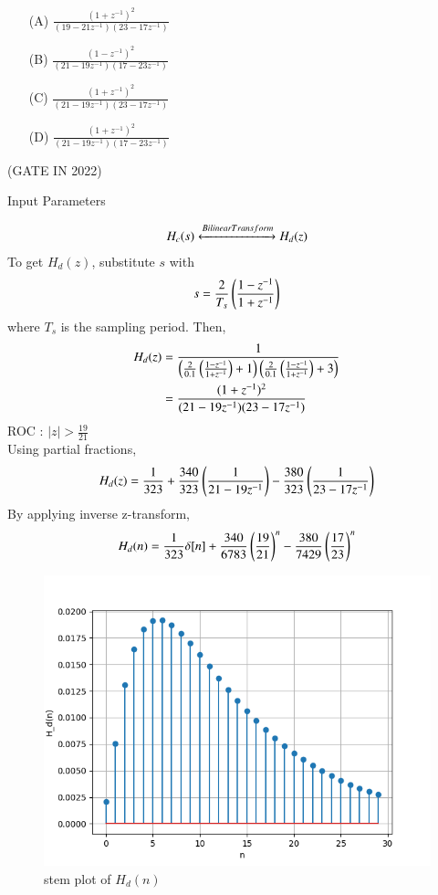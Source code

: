 \documentclass[journal,12pt,twocolumn]{IEEEtran}
\theoremstyle{remark}
\begin{document}
\begin{enumerate}
\item[(A)] $\frac{(1+z^{-1})^2}{(19-21z^{-1})(23-17z^{-1})}$\\
\item[(B)] $\frac{(1-z^{-1})^2}{(21-19z^{-1})(17-23z^{-1})}$\\
\item[(C)] $\frac{(1+z^{-1})^2}{(21-19z^{-1})(23-17z^{-1})}$\\
\item[(D)] $\frac{(1+z^{-1})^2}{(21-19z^{-1})(17-23z^{-1})}$
\end{enumerate}
\hfill{(GATE IN 2022)}\\
\solution
\begin{table}[h!]
\centering

\caption{Input Parameters}
\label{tab:gate2022in38table}
\end{table}
\begin{align}
H_c(s) \xleftrightarrow{Bilinear Transform} H_d(z)
\end{align}
To get $H_d(z)$, substitute $s$ with
\begin{align}
s = \frac{2}{T_s}\left(\frac{1-z^{-1}}{1+z^{-1}}\right)
\end{align}
where $T_s$ is the sampling period. Then,
\begin{align}
H_d(z) &= \frac{1}{\left(\frac{2}{0.1}\left(\frac{1-z^{-1}}{1+z^{-1}}\right)+1\right){\left(\frac{2}{0.1}\left(\frac{1-z^{-1}}{1+z^{-1}}\right)+3\right)}}\\
&= \frac{(1+z^{-1})^2}{(21-19z^{-1})(23-17z^{-1})}
\end{align}
ROC : $|z| > \frac{19}{21}$\\
Using partial fractions,
\begin{align}
H_d(z) = \frac{1}{323} + \frac{340}{323}\left(\frac{1}{21-19z^{-1}}\right) - \frac{380}{323}\left(\frac{1}{23-17z^{-1}}\right)
\end{align}
By applying inverse z-transform,
\begin{align}
H_d(n) = \frac{1}{323}\delta[n] + \frac{340}{6783}\left(\frac{19}{21}\right)^{n} - \frac{380}{7429}\left(\frac{17}{23}\right)^{n}
\end{align}
\begin{figure}[h!]
    \centering
    \includegraphics[width=0.8\columnwidth]{figs/plot.png}
    \caption{stem plot of $H_d(n)$}
    \label{fig:gate2022in38fig}
\end{figure}
\end{document}
